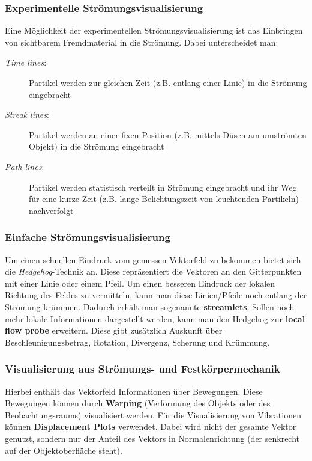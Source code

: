 \documentclass[12pt,a4paper,oneside,normalheadings,abstracton,liststotoc,bibtotoc,titlepage,pdftex]{scrbook}
\begin{document}
\subsubsection{Experimentelle Strömungsvisualisierung}
Eine Möglichkeit der experimentellen Strömungsvisualisierung ist das Einbringen von sichtbarem Fremdmaterial in die Strömung. Dabei unterscheidet man:
\begin{description}
\item[\textit{Time lines}:] Partikel werden zur gleichen Zeit (z.B. entlang einer Linie) in die Strömung eingebracht
\item[\textit{Streak lines}:] Partikel werden an einer fixen Position (z.B. mittels Düsen am umströmten Objekt) in die Strömung eingebracht
\item[\textit{Path lines}:] Partikel werden statistisch verteilt in Strömung eingebracht und ihr Weg für eine kurze Zeit (z.B. lange Belichtungszeit von leuchtenden Partikeln) nachverfolgt
\end{description}

\subsubsection{Einfache Strömungsvisualisierung}
Um einen schnellen Eindruck vom gemessen Vektorfeld zu bekommen bietet sich die \textit{Hedgehog}-Technik an. Diese repräsentiert die Vektoren an den Gitterpunkten mit einer Linie oder einem Pfeil. Um einen besseren Eindruck der lokalen Richtung des Feldes zu vermitteln, kann man diese Linien/Pfeile noch entlang der Strömung krümmen. Dadurch erhält man sogenannte \textbf{streamlets}. Sollen noch mehr lokale Informationen dargestellt werden, kann man den Hedgehog zur \textbf{local flow probe} erweitern. Diese gibt zusätzlich Auskunft über Beschleunigungsbetrag, Rotation, Divergenz, Scherung und Krümmung.

\subsubsection{Visualisierung aus Strömungs- und Festkörpermechanik}
Hierbei enthält das Vektorfeld Informationen über Bewegungen. Diese Bewegungen können durch \textbf{Warping} (Verformung des Objekts oder des Beobachtungsraums) visualisiert werden. Für die Visualisierung von Vibrationen können \textbf{Displacement Plots} verwendet. Dabei wird nicht der gesamte Vektor genutzt, sondern nur der Anteil des Vektors in Normalenrichtung (der senkrecht auf der Objektoberfläche steht).
\end{document}
